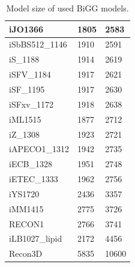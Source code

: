 \begin{table}[!ht]
\begin{tabular}{lll}
        iJO1366 & 1805 & 2583 \\ \hline
        iSbBS512\_1146 & 1910 & 2591 \\ \hline
        iS\_1188 & 1914 & 2619 \\ \hline
        iSFV\_1184 & 1917 & 2621 \\ \hline
        iSF\_1195 & 1917 & 2630 \\ \hline
        iSFxv\_1172 & 1918 & 2638 \\ \hline
        iML1515 & 1877 & 2712 \\ \hline
        iZ\_1308 & 1923 & 2721 \\ \hline
        iAPECO1\_1312 & 1942 & 2735 \\ \hline
        iECB\_1328 & 1951 & 2748 \\ \hline
        iETEC\_1333 & 1962 & 2756 \\ \hline
        iYS1720 & 2436 & 3357 \\ \hline
        iMM1415 & 2775 & 3726 \\ \hline
        RECON1 & 2766 & 3741 \\ \hline
        iLB1027\_lipid & 2172 & 4456 \\ \hline
        Recon3D & 5835 & 10600 \\ \hline
    \end{tabular}
    \caption{\label{Tab:big_model_size} Model size of used BiGG models.}
\end{table}